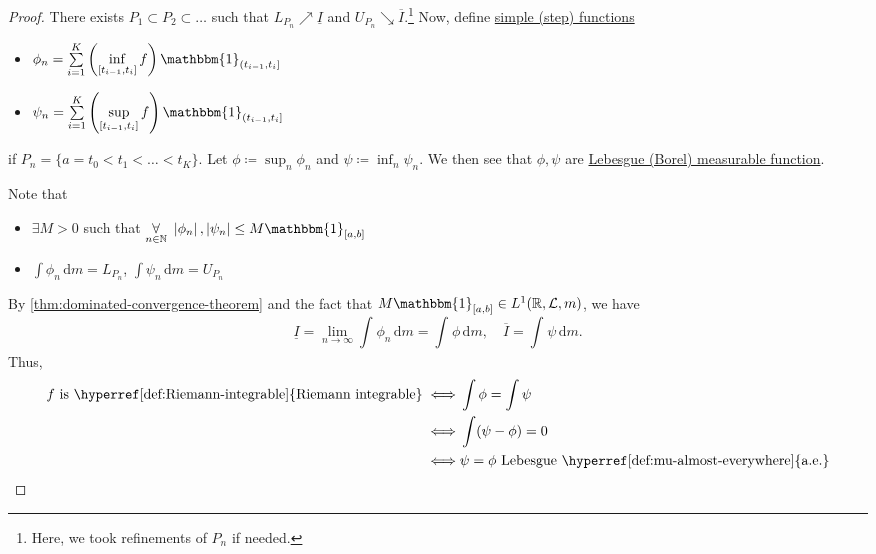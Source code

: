 \begin{proof}
	There exists \(P_1\subset P_2\subset \ldots  \) such that \(L_{P_{n}}\nearrow \underline{I} \) and \(U_{P_{n}}\searrow \overline{I} \).\footnote{Here, we took refinements of \(P_{n}\) if needed.}
	Now, define \hyperref[def:simple-function]{simple (step) functions}
	\begin{itemize}
		\item \(\phi _{n} = \sum\limits_{i=1}^{K} \left(\inf\limits_{[t_{i-1}, t_{i}]} f \right) \mathbbm{1}_{(t_{i-1}, t_{i}]} \)
		\item \(\psi _{n} = \sum\limits_{i=1}^{K} \left(\sup\limits_{[t_{i-1}, t_{i}]} f \right) \mathbbm{1}_{(t_{i-1}, t_{i}]} \)
	\end{itemize}
	if \(P_{n} = \{a = t_0 < t_1 < \ldots < t_{K} \}\). Let \(\phi \coloneqq \sup_n \phi _{n}\) and \(\psi \coloneqq \inf _n \psi _{n}\).
	We then see that \(\phi , \psi \) are \hyperref[def:measurable-function]{Lebesgue (Borel) measurable function}.
	\begin{note}
		Note that
		\begin{itemize}
			\item \(\exists M> 0\) such that \(\underset{n\in\mathbb{\MakeUppercase{n}} }{\forall }\ \left\vert \phi _{n} \right\vert, \left\vert \psi _{n} \right\vert \leq M\mathbbm{1}_{[a, b]} \)
			\item \(\int \phi _{n}\,\mathrm{d}m = L_{P_{n}}\), \(\int \psi _{n}\,\mathrm{d}m = U_{P_{n}}\)
		\end{itemize}
	\end{note}
	By \autoref{thm:dominated-convergence-theorem} and the fact that \(M\mathbbm{1}_{[a, b]} \in L^1(\mathbb{\MakeUppercase{r}} , \mathcal{\MakeUppercase{l}} , m) \),
	we have
	\[
		\underline{I} = \lim\limits_{n \to \infty} \int_{}^{} \phi _{n} \,\mathrm{d}m = \int_{}^{} \phi  \,\mathrm{d}m,\quad \overline{I}  = \int_{}^{} \psi  \,\mathrm{d}m.
	\]
	Thus,
	\[
		\begin{split}
			f \text{ is \hyperref[def:Riemann-integrable]{Riemann integrable}}
			\iff  &\int \phi = \int \psi\\
			\iff  &\int (\psi - \phi ) = 0\\
			\iff  &\psi = \phi \text{ Lebesgue \hyperref[def:mu-almost-everywhere]{a.e.}}
		\end{split}
	\]
\end{proof}

